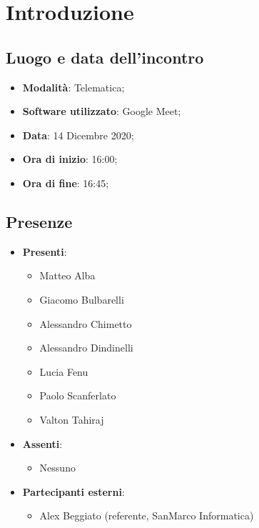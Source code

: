 \documentclass[]{article}
\begin{document}
	
	\newpage


	\section{Introduzione}
		\subsection{Luogo e data dell'incontro}
		\begin{itemize}
			\item \textbf{Modalità}: Telematica;
			\item \textbf{Software utilizzato}: Google Meet;
			\item \textbf{Data}: 14 Dicembre 2020;
			\item \textbf{Ora di inizio}: 16:00;
			\item \textbf{Ora di fine}: 16:45;
		\end{itemize}

		\subsection{Presenze}
		\begin{itemize}
			\item \textbf{Presenti}:
			\begin{itemize}
				\item Matteo Alba
				\item Giacomo Bulbarelli
				\item Alessandro Chimetto
				\item Alessandro Dindinelli
				\item Lucia Fenu
				\item Paolo Scanferlato
				\item Valton Tahiraj
			\end{itemize}
			\item \textbf{Assenti}:
			\begin{itemize}
				\item Nessuno
			\end{itemize}
			\item \textbf{Partecipanti esterni}:
			\begin{itemize}
			\item Alex Beggiato (referente, SanMarco Informatica)
		\end{itemize}
		\end{itemize}
\end{document}
